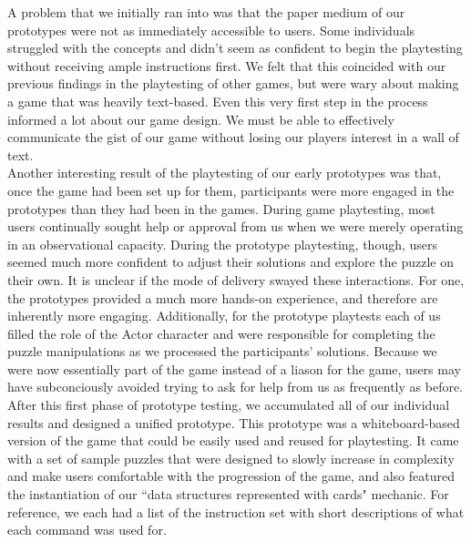 A problem that we initially ran into was that the paper medium of our prototypes were not as immediately accessible to users. Some individuals struggled with the concepts and didn't seem as confident to begin the playtesting without receiving ample instructions first. We felt that this coincided with our previous findings in the playtesting of other games, but were wary about making a game that was heavily text-based. Even this very first step in the process informed a lot about our game design. We must be able to effectively communicate the gist of our game without losing our players interest in a wall of text.\\

Another interesting result of the playtesting of our early prototypes was that, once the game had been set up for them, participants were more engaged in the prototypes than they had been in the games. During game playtesting, most users continually sought help or approval from us when we were merely operating in an observational capacity. During the prototype playtesting, though, users seemed much more confident to adjust their solutions and explore the puzzle on their own. It is unclear if the mode of delivery swayed these interactions. For one, the prototypes provided a much more hands-on experience, and therefore are inherently more engaging. Additionally, for the prototype playtests each of us filled the role of the Actor character and were responsible for completing the puzzle manipulations as we processed the participants' solutions. Because we were now essentially part of the game instead of a liason for the game, users may have subconciously avoided trying to ask for help from us as frequently as before.\\

After this first phase of prototype testing, we accumulated all of our individual results and designed a unified prototype. This prototype was a whiteboard-based version of the game that could be easily used and reused for playtesting. It came with a set of sample puzzles that were designed to slowly increase in complexity and make users comfortable with the progression of the game, and also featured the instantiation of our ``data structures represented with cards" mechanic. For reference, we each had a list of the instruction set with short descriptions of what each command was used for.\\

